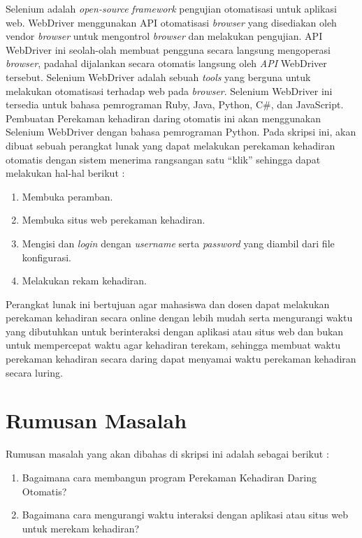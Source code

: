 Selenium adalah \textit{open-source} \textit{framework} pengujian otomatisasi untuk aplikasi web\cite{selenium}. WebDriver menggunakan API otomatisasi \textit{browser} yang disediakan oleh vendor \textit{browser} untuk mengontrol \textit{browser} dan melakukan pengujian. API WebDriver ini seolah-olah membuat pengguna secara langsung mengoperasi \textit{browser}, padahal dijalankan secara otomatis langsung oleh \textit{API} WebDriver tersebut. Selenium WebDriver adalah sebuah \textit{tools} yang berguna untuk melakukan otomatisasi terhadap web pada \textit{browser}. Selenium WebDriver ini tersedia untuk bahasa pemrograman Ruby, Java, Python, C\#, dan JavaScript. Pembuatan Perekaman kehadiran daring otomatis ini akan menggunakan Selenium WebDriver dengan bahasa pemrograman Python.  
\newpage
Pada skripsi ini, akan dibuat sebuah perangkat lunak yang dapat melakukan perekaman kehadiran otomatis dengan sistem menerima rangsangan satu ``klik'' sehingga dapat melakukan hal-hal berikut :
\begin{enumerate}
	\item Membuka peramban.
	\item Membuka situs web perekaman kehadiran.
	\item Mengisi dan \textit{login} dengan \textit{username} serta \textit{password} yang diambil dari file konfigurasi.
	\item Melakukan rekam kehadiran.
\end{enumerate} 
Perangkat lunak ini bertujuan agar mahasiswa dan dosen dapat melakukan perekaman kehadiran secara online dengan lebih mudah serta mengurangi waktu yang dibutuhkan untuk berinteraksi dengan aplikasi atau situs web dan bukan untuk mempercepat waktu agar kehadiran terekam, sehingga membuat waktu perekaman kehadiran secara daring dapat menyamai waktu perekaman kehadiran secara luring. 


\section{Rumusan Masalah}
\label{sec:rumusan}
Rumusan masalah yang akan dibahas di skripsi ini adalah sebagai berikut :
\begin{enumerate}
	\item Bagaimana cara membangun program Perekaman Kehadiran Daring Otomatis?
	\item Bagaimana cara mengurangi waktu interaksi dengan aplikasi atau situs web untuk merekam kehadiran?
\end{enumerate}

